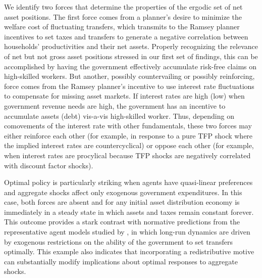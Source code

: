 \documentclass[thmsb,11pt]{article}
\begin{document}
We identify two forces that determine the properties of the ergodic set of net asset positions. The first force comes from a planner's desire to minimize the welfare cost of fluctuating transfers, which transmits to the Ramsey planner incentives to set taxes and transfers to generate a negative correlation between households' productivities and their
net assets. Properly recognizing the relevance  of net but not gross asset positions stressed in
our first set of findings, this  can be accomplished by having the  government  effectively accumulate risk-free claims on high-skilled workers.
But another, possibly countervailing or possibly reinforcing,  force  comes from the Ramsey planner's incentive to  use  interest rate fluctuations  to compensate for missing asset markets. If interest rates are high (low) when government revenue needs are high, the government has an incentive to accumulate assets (debt) vis-a-vis high-skilled worker. Thus, depending on  comovements of the interest rate with other fundamentals, these two forces  may either reinforce each other (for example, in response to  a pure TFP shock where the implied interest rates are countercyclical) or oppose each other (for example, when  interest rates are procylical because TFP shocks are negatively correlated with discount factor shocks).

Optimal policy is particularly striking when agents have quasi-linear preferences and aggregate shocks affect only exogenous government expenditures. In this case, both  forces are absent and for any initial asset distribution economy is immediately in a steady state in which assets and taxes remain constant forever. This outcome provides a stark contrast with normative predictions from the representative agent models studied by \citet{Aiyagari2002}, in which  long-run dynamics are driven by exogenous restrictions on the ability of the government to set transfers optimally. \color{blue}This example also indicates that incorporating a redistributive motive can  substantially modify implications about  optimal responses to  aggregate shocks.
\color{black}
\end{document}
